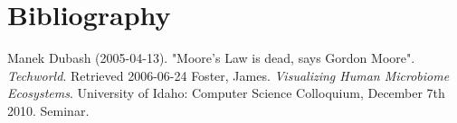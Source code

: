 



\section{Bibliography}

\begin{thebibliography}{99}
 Manek Dubash (2005-04-13). "Moore's Law is dead, says 
	Gordon Moore". {\em Techworld}. Retrieved 2006-06-24
 Foster, James. {\em Visualizing Human Microbiome
        Ecosystems}. University of Idaho: Computer Science Colloquium, 
        December 7th 2010. Seminar.	


\end{thebibliography}
